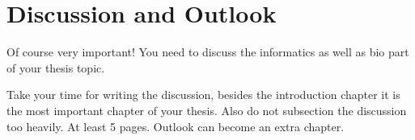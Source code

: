 
\chapter{Discussion and Outlook}
  \label{Discussion}

Of course very important! You need to discuss the informatics as well as bio part of your thesis topic.

\bigskip
Take your time for writing the discussion, besides the introduction chapter it is the most important chapter of your thesis.
Also do not subsection the discussion too heavily.
\clearpage
At least 5 pages.
\clearpage
Outlook can become an extra chapter.
